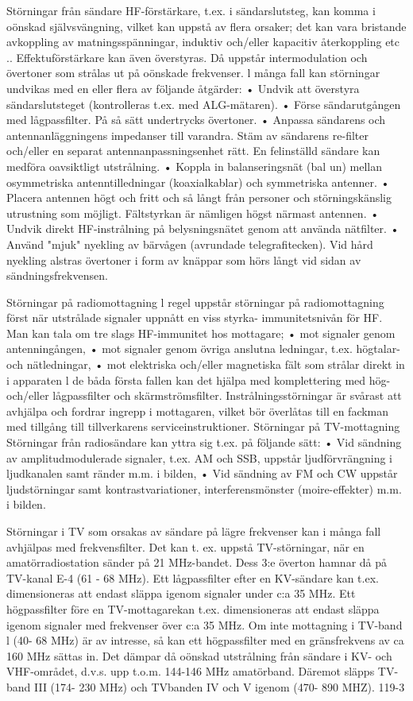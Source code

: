 \documentclass[a4paper,twoside,twocolumn,openright]{book}
\begin{document}
{{{{{Störningar från sändare
HF-förstärkare, t.ex. i sändarslutsteg, kan
komma i oönskad självsvängning, vilket kan
uppstå av flera orsaker; det kan vara bristande avkoppling av matningsspänningar, induktiv och/eller kapacitiv återkoppling etc ..
Effektuförstärkare kan även överstyras.
Då uppstår intermodulation och övertoner
som strålas ut på oönskade frekvenser.
l många fall kan störningar undvikas med
en eller flera av följande åtgärder:
• Undvik att överstyra sändarslutsteget
(kontrolleras t.ex. med ALG-mätaren).
• Förse sändarutgången med lågpassfilter.
På så sätt undertrycks övertoner.
• Anpassa sändarens och antennanläggningens impedanser till varandra. Stäm
av sändarens re-filter och/eller en separat
antennanpassningsenhet rätt. En felinställd sändare kan medföra oavsiktligt
utstrålning.
• Koppla in balanseringsnät (bal un) mellan
osymmetriska antenntilledningar (koaxialkablar) och symmetriska antenner.
• Placera antennen högt och fritt och så
långt från personer och störningskänslig
utrustning som möjligt. Fältstyrkan är
nämligen högst närmast antennen.
• Undvik direkt HF-instrålning på belysningsnätet genom att använda nätfilter.
• Använd "mjuk" nyekling av bärvågen (avrundade telegrafitecken). Vid hård nyekling alstras övertoner i form av knäppar
som hörs långt vid sidan av sändningsfrekvensen.

Störningar på radiomottagning
l regel uppstår störningar på radiomottagning
först när utstrålade signaler uppnått en viss
styrka- immunitetsnivån för HF.
Man kan tala om tre slags HF-immunitet
hos mottagare;
• mot signaler genom antenningången,
• mot signaler genom övriga anslutna ledningar, t.ex. högtalar- och nätledningar,
• mot elektriska och/eller magnetiska fält
som strålar direkt in i apparaten
l de båda första fallen kan det hjälpa med
komplettering med hög- och/eller lågpassfilter och skärmströmsfilter.
Instrålningsstörningar är svårast att avhjälpa och fordrar ingrepp i mottagaren, vilket bör överlåtas till en fackman med tillgång
till tillverkarens serviceinstruktioner.
Störningar på TV-mottagning
Störningar från radiosändare kan yttra sig
t.ex. på följande sätt:
• Vid sändning av amplitudmodulerade signaler, t.ex. AM och SSB, uppstår ljudförvrängning i ljudkanalen samt ränder
m.m. i bilden,
• Vid sändning av FM och CW uppstår ljudstörningar samt kontrastvariationer, interferensmönster (moire-effekter) m.m. i
bilden.

Störningar i TV som orsakas av sändare
på lägre frekvenser kan i många fall avhjälpas med frekvensfilter. Det kan t. ex. uppstå
TV-störningar, när en amatörradiostation
sänder på 21 MHz-bandet. Dess 3:e överton
hamnar då på TV-kanal E-4 (61 - 68 MHz).
Ett lågpassfilter efter en KV-sändare kan
t.ex. dimensioneras att endast släppa igenom signaler under c:a 35 MHz.
Ett högpassfilter före en TV-mottagarekan t.ex. dimensioneras att endast släppa
igenom signaler med frekvenser över c:a 35
MHz.
Om inte mottagning i TV-band l (40- 68
MHz) är av intresse, så kan ett högpassfilter
med en gränsfrekvens av ca 160 MHz sättas
in. Det dämpar då oönskad utstrålning från
sändare i KV- och VHF-området, d.v.s. upp
t.o.m. 144-146 MHz amatörband. Däremot
släpps TV-band III (174- 230 MHz) och TVbanden IV och V igenom (470- 890 MHZ).
119-3

}}}}}
\end{document}
